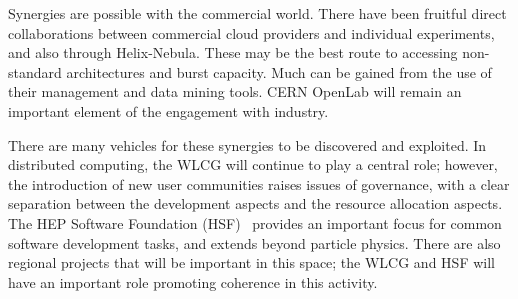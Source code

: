 Synergies are possible with the commercial world. There have been fruitful direct collaborations between commercial cloud providers and individual experiments, and also through Helix-Nebula. These may be the best route to accessing non-standard architectures and burst capacity. Much can be gained from the use of their management and data mining tools. CERN OpenLab will remain an important element of the engagement with industry.

There are many vehicles for these synergies to be discovered and exploited. In distributed computing, the WLCG will continue to play a central role; however, the introduction of new user communities raises issues of governance, with a clear separation between the development aspects and the resource allocation aspects. The HEP Software Foundation (HSF)~\cite{bib:HSF}  provides an important focus for common software development tasks, and extends beyond particle physics. There are also regional projects that will be important in this space; the WLCG and HSF will have an important role promoting coherence in this activity.  
